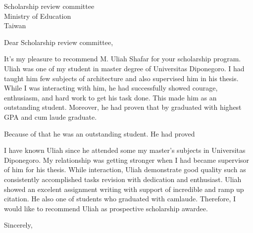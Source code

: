 \documentclass[12pt, a4paper]{simref} %
\begin{document}

\begin{letter}{
	Scholarship review committee\\
	Ministry of Education\\
	Taiwan\\
}


\opening{Dear Scholarship review committee,}

It's my pleasure to recommend M. Uliah Shafar for your scholarship program. Uliah was one of my student in master degree of Universitas Diponegoro. I had taught him few subjects of architecture and also supervised him in his thesis. While I was interacting with him, he had successfully showed courage, enthusiasm, and hard work to get his task done. This made him as an outstanding student. Moreover, he had proven that by graduated with highest GPA and cum laude graduate.

Because of that he was an outstanding student. He had proved

I have known Uliah since he attended some my master's subjects in Universitas Diponegoro. My relationship was getting stronger when I had became supervisor of him for his thesis. While interaction, Uliah demonstrate good quality such as consistently accomplished tasks revision with dedication and enthusiast. Uliah showed an excelent  assignment writing with support of incredible and ramp up citation. He also one of students who graduated with camlaude. Therefore, I would like to recommend Uliah as prospective scholarship awardee.

\closing{Sincerely,}




\end{letter}
\end{document}
